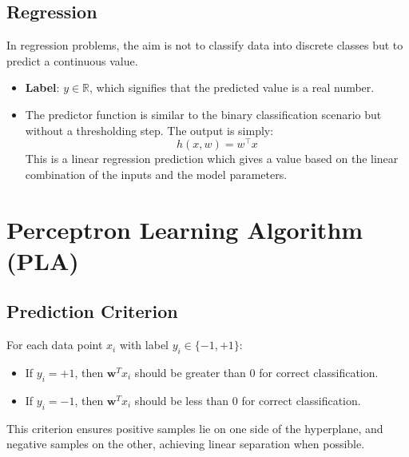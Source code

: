 \subsection{Regression}
In regression problems, the aim is not to classify data into discrete classes but to predict a continuous value.
\begin{itemize}
    \item \textbf{Label}: $y \in \mathbb{R}$, which signifies that the predicted value is a real number.
    \item The predictor function is similar to the binary classification scenario but without a thresholding step. The output is simply:
    \[
    h(x, w) = w^\top x
    \]
    This is a linear regression prediction which gives a value based on the linear combination of the inputs and the model parameters.
\end{itemize}

\section{Perceptron Learning Algorithm (PLA)}


\subsection{Prediction Criterion}
For each data point \( x_i \) with label \( y_i \in \{-1, +1\} \):
\begin{itemize}
    \item If \( y_i = +1 \), then \( \mathbf{w}^T x_i \) should be greater than 0 for correct classification.
    \item If \( y_i = -1 \), then \( \mathbf{w}^T x_i \) should be less than 0 for correct classification.
\end{itemize}
This criterion ensures positive samples lie on one side of the hyperplane, and negative samples on the other, achieving linear separation when possible. \\


